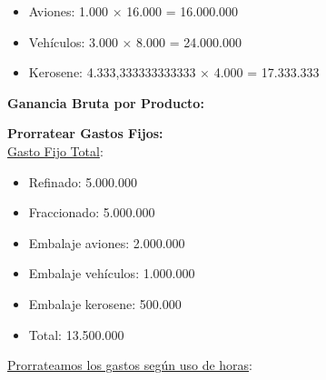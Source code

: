 \documentclass[10pt,a4paper]{article}
\begin{document}
\begin{enumerate}
    \begin{itemize}

        \item Aviones: 1.000 × 16.000 = 16.000.000
        \item Vehículos: 3.000 × 8.000 = 24.000.000
        \item Kerosene: 4.333,333333333333 × 4.000 = 17.333.333 \\

    \end{itemize}

    \vspace{0.5em}

    \textbf{Ganancia Bruta por Producto:}

    \begin{center}
    \end{center}
    

    \textbf{Prorratear Gastos Fijos:} \\

    \underline{Gasto Fijo Total}:

    \begin{itemize}

        \item Refinado: 5.000.000
        \item Fraccionado: 5.000.000
        \item Embalaje aviones: 2.000.000
        \item Embalaje vehículos: 1.000.000
        \item Embalaje kerosene: 500.000 \\
        \item Total: 13.500.000 \\

    \end{itemize}

    \underline{Prorrateamos los gastos según uso de horas}: \\


\end{enumerate}
\end{document}
